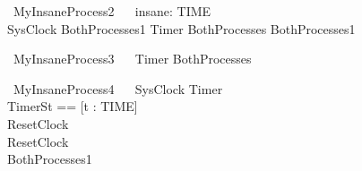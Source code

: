\documentclass{llncs}
\begin{document}
\begin{circus}
\circprocess ~MyInsaneProcess2 ~\circdef~ \Semi insane: TIME \circspot \\
		SysClock  \intchoice BothProcesses1 \extchoice Timer \circseq BothProcesses \intchoice BothProcesses1\\
\end{circus}
\begin{circus}

\circprocess ~MyInsaneProcess3 ~\circdef~
		Timer \lpar \lchanset \rchanset \rpar BothProcesses\\
\end{circus}
\begin{circus}

\circprocess ~MyInsaneProcess4 ~\circdef~
		SysClock \extchoice Timer \lpar \lchanset \rchanset \rpar \circbegin\\
  \circstate TimerSt == [t : TIME]\\
  ResetClock ~\circdef~\Skip\\
  \circspot ResetClock\\
  \circend \intchoice BothProcesses1\\
\end{circus}
\end{document}
